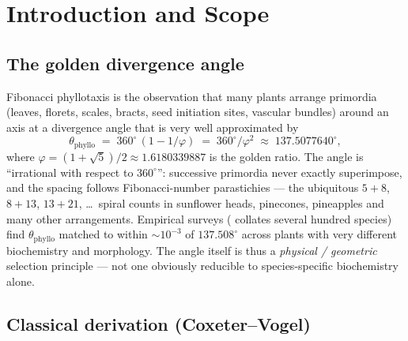 \documentclass[12pt]{article}
\newcommand{\phig}{\varphi}
\begin{document}
\begin{abstract}
The empirical comparison against published plant-biology divergence
measurements is reviewed (matches to $\sim 10^{-3}$ precision are
standard~\cite{Jean1994}). Every step is classified as
\textbf{derived} (proved), \textbf{identified} (structural
correspondence), or \textbf{open}. No new mathematical claim exceeds
what is already established at B6 upstream; this paper is a
consolidation into journal form with a formal theorem statement
and an explicit conditional placement of the classical
$360^{\circ}/\phig^2$ selection on the B2 decagram substrate.
\end{abstract}

\section{Introduction and Scope}\label{sec:intro}

\subsection{The golden divergence angle}

Fibonacci phyllotaxis is the observation that many plants arrange
primordia (leaves, florets, scales, bracts, seed initiation sites,
vascular bundles) around an axis at a divergence angle that is
very well approximated by
\begin{equation}\label{eq:golden}
    \theta_{\mathrm{phyllo}} \;=\; 360^{\circ}\,(1 - 1/\phig)
    \;=\; 360^{\circ}/\phig^2
    \;\approx\; 137.5077640^{\circ},
\end{equation}
where $\phig = (1+\sqrt{5})/2 \approx 1.6180339887$ is the golden
ratio. The angle is ``irrational with respect to $360^{\circ}$'':
successive primordia never exactly superimpose, and the spacing
follows Fibonacci-number parastichies --- the ubiquitous $5+8$,
$8+13$, $13+21$, \ldots\ spiral counts in sunflower heads, pinecones,
pineapples and many other arrangements. Empirical surveys
(\cite{Jean1994} collates several hundred species) find
$\theta_{\mathrm{phyllo}}$ matched to within $\sim10^{-3}$ of
$137.508^{\circ}$ across plants with very different biochemistry and
morphology. The angle itself is thus a \emph{physical / geometric}
selection principle --- not one obviously reducible to
species-specific biochemistry alone.

\subsection{Classical derivation (Coxeter--Vogel)}
\end{document}

